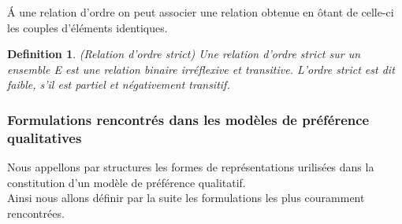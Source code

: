 \documentclass[a4paper,12pt,openany,oneside]{article}
\newtheorem{defn}{Definition} %
\begin{document}
Á une relation d’ordre on peut associer une relation obtenue en ôtant de celle-ci les couples d’éléments identiques.

\begin{defn}(Relation d’ordre strict)
 Une relation d’ordre strict sur un ensemble E est une relation binaire irréflexive et transitive. L’ordre strict est dit faible, s’il est partiel et négativement transitif.
\end{defn}



\subsubsection{Formulations rencontrés dans les modèles de préférence qualitatives}

Nous appellons par structures les formes de représentations urilisées dans la constitution d'un modèle de préférence qualitatif.\\
Ainsi nous allons définir par la suite les formulations les plus couramment rencontrées.
\end{document}
